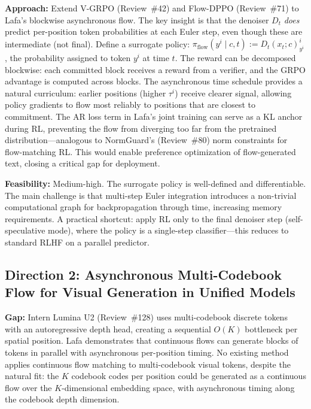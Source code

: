 \documentclass[11pt,a4paper]{article}
\begin{document}
\textbf{Approach:} Extend V-GRPO (Review~\#42) and Flow-DPPO (Review~\#71) to Lafa's blockwise asynchronous flow. The key insight is that the denoiser $D_t$ \emph{does} predict per-position token probabilities at each Euler step, even though these are intermediate (not final). Define a surrogate policy: $\pi_{\text{flow}}(y^i \mid c, t) := D_t(x_t; c)^i_{y^i}$, the probability assigned to token $y^i$ at time $t$. The reward can be decomposed blockwise: each committed block receives a reward from a verifier, and the GRPO advantage is computed across blocks. The asynchronous time schedule provides a natural curriculum: earlier positions (higher $\tau^i$) receive clearer signal, allowing policy gradients to flow most reliably to positions that are closest to commitment. The AR loss term in Lafa's joint training can serve as a KL anchor during RL, preventing the flow from diverging too far from the pretrained distribution---analogous to NormGuard's (Review~\#80) norm constraints for flow-matching RL. This would enable preference optimization of flow-generated text, closing a critical gap for deployment.

\textbf{Feasibility:} Medium-high. The surrogate policy is well-defined and differentiable. The main challenge is that multi-step Euler integration introduces a non-trivial computational graph for backpropagation through time, increasing memory requirements. A practical shortcut: apply RL only to the final denoiser step (self-speculative mode), where the policy is a single-step classifier---this reduces to standard RLHF on a parallel predictor.

\subsection{Direction 2: Asynchronous Multi-Codebook Flow for Visual Generation in Unified Models}
\textbf{Gap:} Intern Lumina U2 (Review~\#128) uses multi-codebook discrete tokens with an autoregressive depth head, creating a sequential $O(K)$ bottleneck per spatial position. Lafa demonstrates that continuous flows can generate blocks of tokens in parallel with asynchronous per-position timing. No existing method applies continuous flow matching to multi-codebook visual tokens, despite the natural fit: the $K$ codebook codes per position could be generated as a continuous flow over the $K$-dimensional embedding space, with asynchronous timing along the codebook depth dimension.
\end{document}
